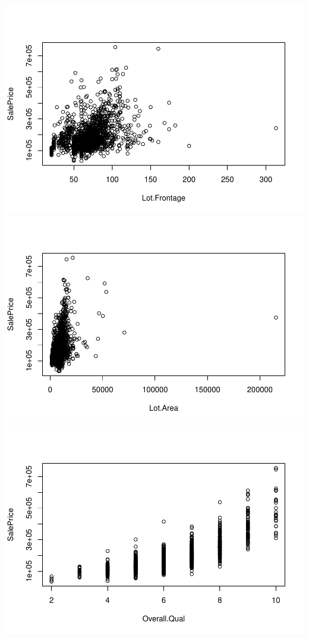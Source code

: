 \documentclass[
]{article}
\begin{document}
\includegraphics{Predicting-Housing-Price_files/figure-latex/unnamed-chunk-2-1.pdf}
\includegraphics{Predicting-Housing-Price_files/figure-latex/unnamed-chunk-2-2.pdf}
\includegraphics{Predicting-Housing-Price_files/figure-latex/unnamed-chunk-2-3.pdf}
\end{document}
